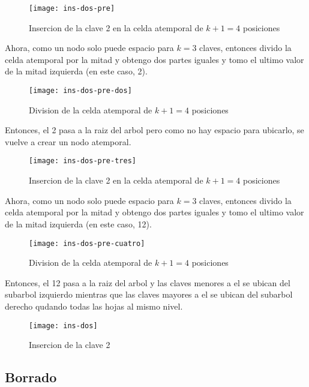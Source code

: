 \documentclass[10pt,a4paper]{article}
\begin{document}
\begin{figure}[h]
\centering
\texttt{[image: ins-dos-pre]}
\caption{Insercion de la clave 2 en la celda atemporal de $k+1 = 4$ posiciones}
\label{drivers1}
\end{figure}
\newpage

Ahora, como un nodo solo puede espacio para $k = 3$ claves, entonces divido la celda atemporal por la mitad y obtengo dos partes iguales y tomo el ultimo valor de la mitad izquierda (en este caso, 2).

\begin{figure}[h]
\centering
\texttt{[image: ins-dos-pre-dos]}
\caption{Division de la celda atemporal de $k+1 = 4$ posiciones}
\label{drivers1}
\end{figure}

Entonces, el 2 pasa a la raiz del arbol pero como no hay espacio para ubicarlo, se vuelve a crear un nodo atemporal.

\begin{figure}[h]
\centering
\texttt{[image: ins-dos-pre-tres]}
\caption{Insercion de la clave 2 en la celda atemporal de $k+1 = 4$ posiciones}
\label{drivers1}
\end{figure}

Ahora, como un nodo solo puede espacio para $k = 3$ claves, entonces divido la celda atemporal por la mitad y obtengo dos partes iguales y tomo el ultimo valor de la mitad izquierda (en este caso, 12).

\begin{figure}[h]
\centering
\texttt{[image: ins-dos-pre-cuatro]}
\caption{Division de la celda atemporal de $k+1 = 4$ posiciones}
\label{drivers1}
\end{figure}
\newpage

Entonces, el 12 pasa a la raiz del arbol y las claves menores a el se ubican del subarbol izquierdo mientras que las claves mayores a el se ubican del subarbol derecho qudando todas las hojas al mismo nivel.

\begin{figure}[h]
\centering
\texttt{[image: ins-dos]}
\caption{Insercion de la clave 2}
\label{drivers1}
\end{figure}
\newpage

\subsection{Borrado}
\end{document}
